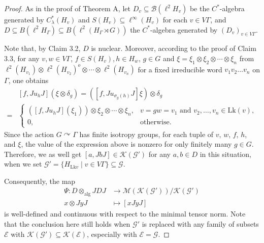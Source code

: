 \documentclass{amsart}
\theoremstyle{definition}
\renewcommand{\subset}{\subseteq}
\newcommand{\longto}{\longrightarrow}
\newcommand{\algtensor}{\otimes_{\mathrm{alg}}}
\begin{document}
\begin{proof}
As in the proof of Theorem A, let $D_v\subset \mathcal{B}(\ell^2 H_v)$ be the $C^{\ast}$-algebra generated by $C^{\ast}_{\lambda}(H_v)$ and $S(H_v)\subset \ell^{\infty}(H_v)$ for each $v\in V\Gamma$, and $D\subset B(\ell^2 H_{\Gamma})\subset B(\ell^2 (H_{\Gamma}\rtimes G))$ the $C^{\ast}$-algebra generated by $(D_v)_{v\in V\Gamma}$. 

Note that, by Claim 3.2, $D$ is nuclear. Moreover, according to the proof of Claim 3.3, for any $v,w\in V\Gamma$, $f\in S(H_v), h\in H_w$, $g\in G$ and  
$\xi = \xi_1\otimes\xi_2\otimes \cdots\otimes \xi_n$ from $\ell^2(H_{v_1})\otimes \ell^2(H_{v_2})^o \otimes \cdots\otimes \ell^2(H_{v_n})$ for a fixed irreducible word $v_1v_2\ldots v_n$ on $\Gamma$, one obtains
\begin{align}
&[f,Ju_hJ](\xi\otimes \delta_g)= 
([f,Ju_{\sigma_g(h)}J]\xi)\otimes \delta_g \\
=&
\begin{cases}
([f,Ju_hJ](\xi_1))\otimes \xi_2\otimes\cdots\otimes\xi_n, 
& v=gw=v_1 \text{ and } v_2, \ldots, v_n\in \mathrm{Lk}(v), \\
0, & \text{otherwise}.
\end{cases}
\end{align}
Since the action $G\curvearrowright \Gamma$ has finite isotropy groups, for each tuple of $v$, $w$, $f$, $h$, and $\xi$, 
the value of the expression above is nonzero for only finitely many $g\in G$. Therefore, we as well get $[a, JbJ]\in \mathcal{K}(\mathcal{G}')$ for any $a,b\in D$ in this situation, when we set $\mathcal{G}'=\{ H_{\mathrm{Lk}v}\mid v\in V\Gamma\}\subset \mathcal{G}$. 

Consequently, the map 
\begin{align}
\Psi : D\algtensor JDJ &\longto \mathcal{M}(\mathcal{K}(\mathcal{G}'))/\mathcal{K}(\mathcal{G}') \\
x\otimes JyJ &\longmapsto [xJyJ]
\end{align}
is well-defined and continuous with respect to the minimal tensor norm. 
Note that the conclusion here still holds when $\mathcal{G}'$ is replaced with any family of subsets $\mathcal{E}$ with $\mathcal{K}(\mathcal{G}')\subset \mathcal{K}(\mathcal{E})$, especially with $\mathcal{E}=\mathcal{G}$. 


\end{proof}
\end{document}
